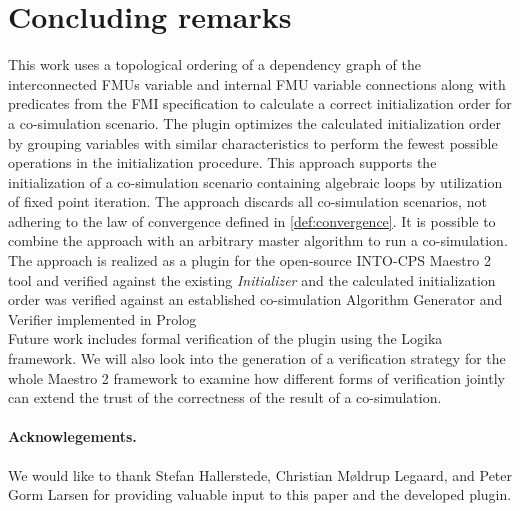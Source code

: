 \section{Concluding remarks}\label{sc:summary}
This work uses a topological ordering of a dependency graph of the interconnected FMUs variable and internal FMU variable connections along with predicates from the FMI specification to calculate a correct initialization order for a co-simulation scenario. The plugin optimizes the calculated initialization order by grouping variables with similar characteristics to perform the fewest possible operations in the initialization procedure.
This approach supports the initialization of a co-simulation scenario containing algebraic loops by utilization of fixed point iteration. The approach discards all co-simulation scenarios, not adhering to the law of convergence defined in \cref{def:convergence}.
It is possible to combine the approach with an arbitrary master algorithm to run a co-simulation. \\
The approach is realized as a plugin for the open-source INTO-CPS Maestro 2 tool and verified against the existing \textit{Initializer} and the calculated initialization order was verified against an established co-simulation Algorithm Generator and Verifier implemented in Prolog\cite{gomes_lucio_vangheluwe_2019}\\
Future work includes formal verification of the plugin using the Logika framework\cite{inbook}.
We will also look into the generation of a verification strategy for the whole Maestro 2 framework to examine how different forms of verification jointly can extend the trust of the correctness of the result of a co-simulation. 

\paragraph*{\textbf{Acknowlegements.}}We would like to thank Stefan Hallerstede, Christian Møldrup Legaard, and Peter Gorm Larsen for providing valuable input to this paper and the developed plugin.